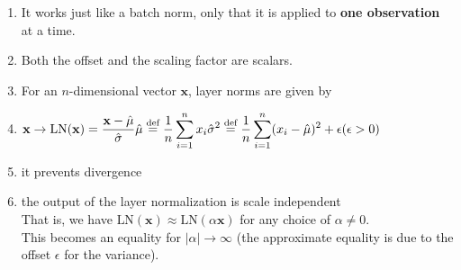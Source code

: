 \begin{enumerate}[itemsep=0.15cm]
    \item It works just like a batch norm, only that it is applied to \textbf{one observation} at a time. 
    
    \item Both the offset and the scaling factor are scalars.

    \item For an $n$-dimensional vector $\mathbf{x}$, layer norms are given by
    
    \item[] $
        \hfill
        \mathbf{x} \rightarrow \textrm{LN}(\mathbf{x}) 
        =  \dfrac{\mathbf{x} - \hat{\mu}}{\hat\sigma}
        \hfill
        \hat{\mu} \stackrel{\textrm{def}}{=} \dfrac{1}{n} \dsum_{i=1}^n x_i
        \hfill
        \hat{\sigma}^2 \stackrel{\textrm{def}}{=} \dfrac{1}{n} \dsum_{i=1}^n (x_i - \hat{\mu})^2 + \epsilon
        \hfill
        (\epsilon > 0)
    $

    \item it prevents divergence

    \item the output of the layer normalization is scale independent\\
    That is, we have $\textrm{LN}(\mathbf{x}) \approx \textrm{LN}(\alpha \mathbf{x})$ for any choice of $\alpha \neq 0$.\\
    This becomes an equality for $|\alpha| \to \infty$ (the approximate equality is due to the offset $\epsilon$ for the variance).


\end{enumerate}































































